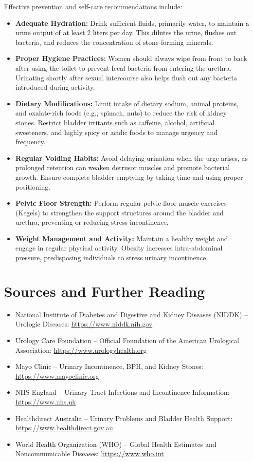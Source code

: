 Effective prevention and self-care recommendations include:
\begin{itemize}
    \item \textbf{Adequate Hydration:} Drink sufficient fluids, primarily water, to maintain a urine output of at least 2 liters per day. This dilutes the urine, flushes out bacteria, and reduces the concentration of stone-forming minerals.
    \item \textbf{Proper Hygiene Practices:} Women should always wipe from front to back after using the toilet to prevent fecal bacteria from entering the urethra. Urinating shortly after sexual intercourse also helps flush out any bacteria introduced during activity.
    \item \textbf{Dietary Modifications:} Limit intake of dietary sodium, animal proteins, and oxalate-rich foods (e.g., spinach, nuts) to reduce the risk of kidney stones. Restrict bladder irritants such as caffeine, alcohol, artificial sweeteners, and highly spicy or acidic foods to manage urgency and frequency.
    \item \textbf{Regular Voiding Habits:} Avoid delaying urination when the urge arises, as prolonged retention can weaken detrusor muscles and promote bacterial growth. Ensure complete bladder emptying by taking time and using proper positioning.
    \item \textbf{Pelvic Floor Strength:} Perform regular pelvic floor muscle exercises (Kegels) to strengthen the support structures around the bladder and urethra, preventing or reducing stress incontinence.
    \item \textbf{Weight Management and Activity:} Maintain a healthy weight and engage in regular physical activity. Obesity increases intra-abdominal pressure, predisposing individuals to stress urinary incontinence.
\end{itemize}

\section*{Sources and Further Reading}
\begin{itemize}
    \item National Institute of Diabetes and Digestive and Kidney Diseases (NIDDK) -- Urologic Diseases: \url{https://www.niddk.nih.gov}
    \item Urology Care Foundation -- Official Foundation of the American Urological Association: \url{https://www.urologyhealth.org}
    \item Mayo Clinic -- Urinary Incontinence, BPH, and Kidney Stones: \url{https://www.mayoclinic.org}
    \item NHS England -- Urinary Tract Infections and Incontinence Information: \url{https://www.nhs.uk}
    \item Healthdirect Australia -- Urinary Problems and Bladder Health Support: \url{https://www.healthdirect.gov.au}
    \item World Health Organization (WHO) -- Global Health Estimates and Noncommunicable Diseases: \url{https://www.who.int}
\end{itemize}